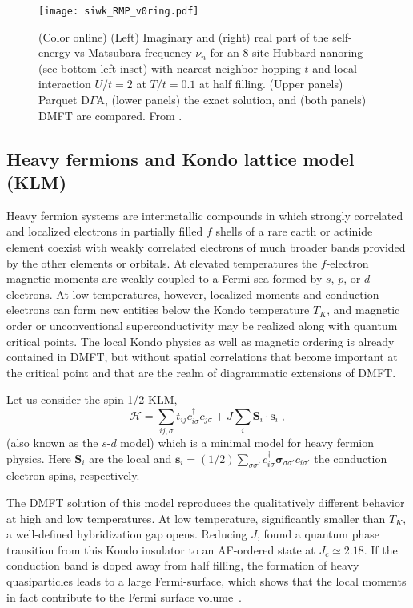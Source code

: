 \documentclass[rmp,aps,reprint,amsmath,amssymb,superscriptaddress,showpacs,nofootinbib]{revtex4-1}
\newcommand{\vc}[1]{\ensuremath{\mathbf{#1}}}
\begin{document}
\begin{figure}[t!]
\begin{center}
  \texttt{[image: siwk\_RMP\_v0ring.pdf]} 
\end{center}
    \caption{(Color online) \label{fig:nanoring} (Left) Imaginary and (right) real part of the self-energy vs Matsubara frequency $\nu_n$ for an $8$-site Hubbard nanoring (see bottom left inset) with nearest-neighbor hopping $t$ and local interaction $U/t=2$ at $T/t=0.1$ at half filling. (Upper panels) Parquet D$\Gamma$A, (lower panels) the exact solution, and (both panels) DMFT are compared. From .}
  \label{fig:phased_db}
\end{figure}

\subsection{Heavy fermions and Kondo lattice model (KLM)}
\label{Results_HF}
Heavy fermion systems  are intermetallic compounds in which strongly correlated and localized electrons in partially filled $f$ shells of a rare earth or actinide element coexist with weakly correlated electrons of much broader bands provided by the other elements or orbitals. At elevated temperatures the $f$-electron magnetic moments are weakly coupled to a Fermi sea formed by $s$, $p$, or $d$ electrons. At low temperatures, however, localized moments and conduction electrons can form new entities below the Kondo temperature $T_K$,  and magnetic order or unconventional superconductivity may be realized along with quantum critical points. The local Kondo physics as well as magnetic ordering is already contained in DMFT, but without spatial correlations that become important at the critical point and that are the realm of diagrammatic extensions of DMFT. 

Let us consider the spin-1/2 KLM,
\begin{equation}
\label{Eq:KLM}
  \mathcal{H} = \sum_{ij,\sigma} t_{ij} c_{i\sigma}^{\dagger}c_{j\sigma} + J\sum_{i} \vc{S}_{i}\cdot \vc{s}_{i} \; ,
\end{equation}
(also known as the $s$-$d$  model) which is a minimal model for heavy fermion physics. Here $\vc{S}_{i}$ are the local and $\vc{s}_{i}=(1/2)\sum_{\sigma\sigma'}c_{i\sigma}^{\dagger}\boldsymbol{\sigma}_{\sigma\sigma'}c_{i\sigma'}$ the conduction electron spins, respectively.

The DMFT solution of this model reproduces the qualitatively different behavior at high and low temperatures. At low temperature, significantly smaller than $T_K$, a well-defined hybridization gap opens. Reducing $J$,  found a quantum phase transition from this Kondo insulator to an AF-ordered state at  $J_c \simeq 2.18$. If the conduction band is doped away from half filling,  the formation of heavy quasiparticles leads to a large Fermi-surface, which shows that the local moments in fact contribute to the Fermi surface volume~\cite{Otsuki2009}.
\end{document}
